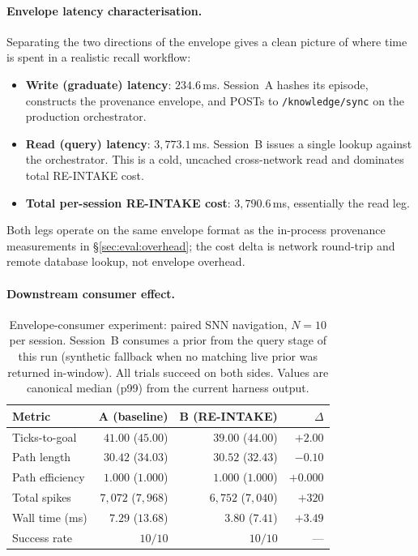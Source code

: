 \documentclass[conference]{IEEEtran}
\providecommand{\measuredFrom}[1]{}
\begin{document}
\paragraph{Envelope latency characterisation.}
Separating the two directions of the envelope gives a clean picture of
where time is spent in a realistic recall workflow:
\begin{itemize}
\item \textbf{Write (graduate) latency}: $234.6$\,ms. Session~A hashes
      its episode, constructs the provenance envelope, and POSTs to
      \texttt{/knowledge/sync} on the production orchestrator.
\item \textbf{Read (query) latency}: $3{,}773.1$\,ms. Session~B issues
      a single lookup against the orchestrator. This is a cold, uncached
      cross-network read and dominates total RE-INTAKE cost.
\item \textbf{Total per-session RE-INTAKE cost}: $3{,}790.6$\,ms, essentially
      the read leg.
\end{itemize}
Both legs operate on the same envelope format as the in-process
provenance measurements in \S\ref{sec:eval:overhead}; the cost delta
is network round-trip and remote database lookup, not envelope overhead.

\paragraph{Downstream consumer effect.}

\begin{table}[t]
\centering
\caption{Envelope-consumer experiment: paired SNN navigation, $N=10$
per session. Session~B consumes a prior from the query stage of this run
(synthetic fallback when no matching live prior was returned in-window).
All trials succeed on both sides. Values are canonical median (p99)
from the current harness output.}
\label{tab:reintake-eval}
\small
\measuredFrom{HoloScript/packages/engine/src/simulation/__tests__/paper-reintake-compounding.test.ts}%
\begin{tabular}{lrrr}
\toprule
\textbf{Metric} & \textbf{A (baseline)} & \textbf{B (RE-INTAKE)} & $\Delta$ \\
\midrule
Ticks-to-goal   & $41.00$ ($45.00$)     & $39.00$ ($44.00$)     & $+2.00$ \\
Path length     & $30.42$ ($34.03$)     & $30.52$ ($32.43$)     & $-0.10$ \\
Path efficiency & $1.000$ ($1.000$)     & $1.000$ ($1.000$)     & $+0.000$ \\
Total spikes    & $7{,}072$ ($7{,}968$) & $6{,}752$ ($7{,}040$) & $+320$  \\
Wall time (ms)  & $7.29$ ($13.68$)      & $3.80$ ($7.41$)       & $+3.49$ \\
Success rate    & $10/10$           & $10/10$           & ---     \\
\bottomrule
\end{tabular}
\end{table}
\end{document}
